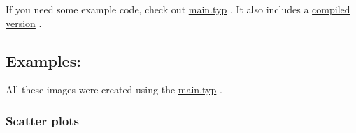 If you need some example code, check out
\href{https://github.com/Pegacraft/typst-plotting/blob/8d834689359b708ce75fe51be05eed45570e463e/example/main.typ}{main.typ}
. It also includes a
\href{https://github.com/Pegacraft/typst-plotting/blob/8d834689359b708ce75fe51be05eed45570e463e/example/Plotting.pdf}{compiled
version} .

\subsection{Examples:}\label{examples}

All these images were created using the
\href{https://github.com/Pegacraft/typst-plotting/blob/8d834689359b708ce75fe51be05eed45570e463e/example/main.typ}{main.typ}
.

\subsubsection{Scatter plots}\label{scatter-plots}


